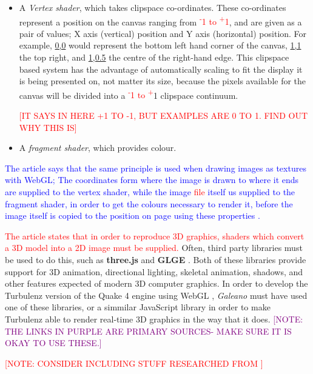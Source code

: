 \begin{itemize}
\item A \emph{Vertex shader}, which takes clipspace co-ordinates. These co-ordinates represent a position on the canvas ranging from \textcolor{red}{\textsuperscript{-}1 to \textsuperscript{+}1}, and are given as a pair of values; X axis (vertical) position and Y axis (horizontal) position. For example, \url{0,0} would represent the bottom left hand corner of the canvas, \url{1,1} the top right, and \url{1,0.5} the centre of the right-hand edge. This clipspace based system has the advantage of automatically scaling to fit the display it is being presented on, not matter its size, because the pixels available for the canvas will be divided into a \textcolor{red}{\textsuperscript{-}1 to \textsuperscript{+}}1 clipspace continuum.

\textcolor{red}{[IT SAYS IN HERE +1 TO -1, BUT EXAMPLES ARE 0 TO 1. FIND OUT WHY THIS IS]}

\item A \emph{fragment shader}, which provides colour.
\end{itemize} 

\textcolor{blue}{The article says that the same principle is used when drawing images as textures with WebGL; The coordinates form where the image is drawn to where it ends are supplied to the vertex shader, while the image \textcolor{red}{file} itself us supplied to the fragment shader, in order to get the colours necessary to render it, before the image itself is copied to the position on page using these properties \cite{WebGLFundamentals}.}

\textcolor{red}{The article states that in order to reproduce 3D graphics, shaders which convert a 3D model into a 2D image must be supplied.} Often, third party libraries must be used to do this, such as \textbf{three.js} \textcolor{purple}{\cite{three.jsManual}} and \textbf{GLGE} \textcolor{purple}{\cite{GLGEWebsite}}. Both of these libraries provide support for 3D animation, directional lighting, skeletal animation, shadows, and other features expected of modern 3D computer graphics. In order to develop the Turbulenz version of the Quake 4 engine using WebGL \cite{TurbulenzWebGLQuake4AssetsVideo}, \emph{Galeano} must have used one of these libraries, or a simmilar JavaScript library in order to make Turbulenz able to render real-time 3D graphics in the way that it does. \textcolor{purple}{[NOTE: THE LINKS IN PURPLE ARE PRIMARY SOURCES- MAKE SURE IT IS OKAY TO USE THESE.]}

\textcolor{red}{[NOTE: CONSIDER INCLUDING STUFF RESEARCHED FROM \cite{WebGLUpAndRunningTonyParisi}]}